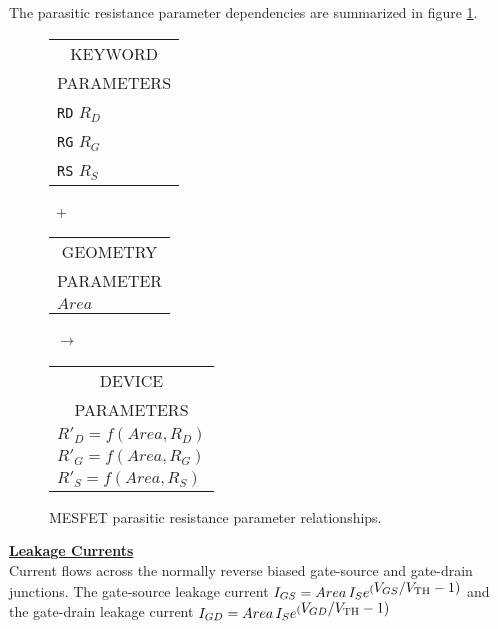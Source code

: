 The parasitic resistance parameter dependencies are summarized in
figure \ref{b1234para}.
\begin{figure}[h]
\parbox[t]{1.3in}{
\begin{tabular}[t]{|p{1in}|}
\hline
\multicolumn{1}{|c|}{KEYWORD} \\
\multicolumn{1}{|c|}{PARAMETERS} \\
\hline
\hline
{\tt RD} \hfill $R_D$\\
{\tt RG} \hfill $R_G$\\
{\tt RS} \hfill $R_S$\\
\hline
\end{tabular}
}
\hfill
\parbox{0.2in}{\ \vspace*{0.2in}\newline +}
\hfill
\begin{tabular}[t]{|p{1in}|}
\hline
\multicolumn{1}{|c|}{GEOMETRY} \\
\multicolumn{1}{|c|}{PARAMETER} \\
\hline
$Area$\\
\hline
\end{tabular}
\hfill
\parbox{0.2in}{\ \vspace*{0.2in}\newline $\rightarrow$}
\hfill
\begin{tabular}[t]{|p{1.8in}|}
\hline
\multicolumn{1}{|c|}{DEVICE}\\
\multicolumn{1}{|c|}{PARAMETERS}\\
\hline
\hspace*{\fill} $R'_D = f(Area, R_D)$\\
\hspace*{\fill} $R'_G = f(Area, R_G)$\\
\hspace*{\fill} $R'_S = f(Area, R_S)$\\
\hline
\end{tabular}
\caption{MESFET parasitic resistance parameter
relationships. \label{b1234para}}
\end{figure}

\noindent\underline{\bf Leakage Currents}\\[0.1in]

Current flows across the normally reverse biased gate-source and gate-drain
junctions.
The gate-source leakage current
$I_{GS} = Area\,I_{S}e^{(\textstyle V_{GS}/V_{\mbox{\scriptsize TH}} -1)}$\inlineeq
and the gate-drain leakage current
$I_{GD} = Area\,I_{S}e^{(\textstyle V_{GD}/V_{\mbox{\scriptsize TH}} -1)}$\inlineeq

